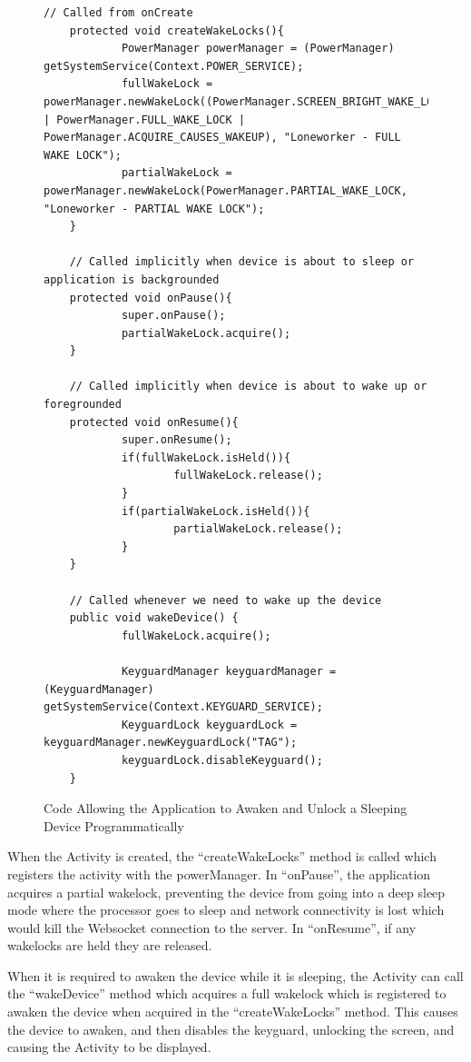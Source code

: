 \begin{figure}[!htpb]
	\centering
	\lstset{language=Java}
	\begin{lstlisting}[tabsize=2,breaklines=true]
	// Called from onCreate
	protected void createWakeLocks(){
			PowerManager powerManager = (PowerManager) getSystemService(Context.POWER_SERVICE);
			fullWakeLock = powerManager.newWakeLock((PowerManager.SCREEN_BRIGHT_WAKE_LOCK | PowerManager.FULL_WAKE_LOCK | PowerManager.ACQUIRE_CAUSES_WAKEUP), "Loneworker - FULL WAKE LOCK");
			partialWakeLock = powerManager.newWakeLock(PowerManager.PARTIAL_WAKE_LOCK, "Loneworker - PARTIAL WAKE LOCK");
	}

	// Called implicitly when device is about to sleep or application is backgrounded
	protected void onPause(){
			super.onPause();
			partialWakeLock.acquire();
	}

	// Called implicitly when device is about to wake up or foregrounded
	protected void onResume(){
			super.onResume();
			if(fullWakeLock.isHeld()){
					fullWakeLock.release();
			}
			if(partialWakeLock.isHeld()){
					partialWakeLock.release();
			}
	}

	// Called whenever we need to wake up the device
	public void wakeDevice() {
			fullWakeLock.acquire();

			KeyguardManager keyguardManager = (KeyguardManager) getSystemService(Context.KEYGUARD_SERVICE);
			KeyguardLock keyguardLock = keyguardManager.newKeyguardLock("TAG");
			keyguardLock.disableKeyguard();
	}
	\end{lstlisting}
	\caption{Code Allowing the Application to Awaken and Unlock a Sleeping Device Programmatically}
	\label{fig:unlockDevice}
\end{figure}

When the Activity is created, the ``createWakeLocks'' method is called which registers the activity with the powerManager.  In ``onPause'', the application acquires a partial wakelock, preventing the device from going into a deep sleep mode where the processor goes to sleep and network connectivity is lost which would kill the Websocket connection to the server.  In ``onResume'', if any wakelocks are held they are released.

When it is required to awaken the device while it is sleeping, the Activity can call the ``wakeDevice'' method which acquires a full wakelock which is registered to awaken the device when acquired in the ``createWakeLocks'' method.  This causes the device to awaken, and then disables the keyguard, unlocking the screen, and causing the Activity to be displayed.

